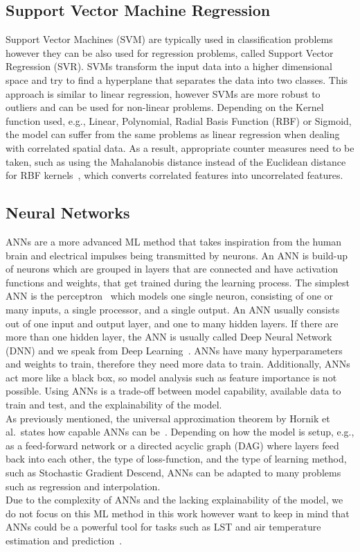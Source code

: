 \subsection{Support Vector Machine Regression}

Support Vector Machines (SVM) are typically used in classification problems however they can be also used for regression problems, called Support Vector Regression (SVR). SVMs transform the input data into a higher dimensional space and try to find a hyperplane that separates the data into two classes. This approach is similar to linear regression, however SVMs are more robust to outliers and can be used for non-linear problems. Depending on the Kernel function used, e.g., Linear, Polynomial, Radial Basis Function (RBF) or Sigmoid, the model can suffer from the same problems as linear regression when dealing with correlated spatial data.
As a result, appropriate counter measures need to be taken, such as using the Mahalanobis distance instead of the Euclidean distance for RBF kernels~\cite{kamada2006support}, which converts correlated features into uncorrelated features.

\subsection{Neural Networks}

ANNs are a more advanced ML method that takes inspiration from the human brain and electrical impulses being transmitted by neurons. An ANN is build-up of neurons which are grouped in layers that are connected and have activation functions and weights, that get trained during the learning process. The simplest ANN is the perceptron~\cite{rosenblatt1957perceptron} which models one single neuron, consisting of one or many inputs, a single processor, and a single output. An ANN usually consists out of one input and output layer, and one to many hidden layers. If there are more than one hidden layer, the ANN is usually called Deep Neural Network (DNN) and we speak from Deep Learning~\cite{lecun2015deep}. ANNs have many hyperparameters and weights to train, therefore they need more data to train. Additionally, ANNs act more like a black box, so model analysis such as feature importance is not possible. Using ANNs is a trade-off between model capability, available data to train and test, and the explainability of the model.\\
As previously mentioned, the universal approximation theorem by Hornik et al.\ states how capable ANNs can be~\cite{hornik1989multilayer}. Depending on how the model is setup, e.g., as a feed-forward network or a directed acyclic graph (DAG) where layers feed back into each other, the type of loss-function, and the type of learning method, such as Stochastic Gradient Descend, ANNs can be adapted to many problems such as regression and interpolation.\\
Due to the complexity of ANNs and the lacking explainability of the model, we do not focus on this ML method in this work however want to keep in mind that ANNs could be a powerful tool for tasks such as LST and air temperature estimation and prediction~\cite{yuan2020deep}.

